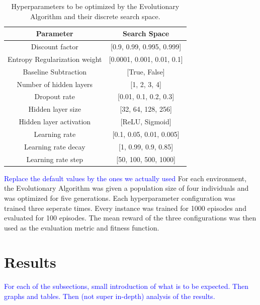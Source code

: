 \documentclass{article}
\newcommand{\TODO}[1]{\textcolor{blue}{#1}}
\begin{document}
\begin{table}[htbp]
    \centering
    \begin{tabular}
        {|c|c|}
        \toprule
        \textbf{Parameter} & \textbf{Search Space} \\
        \midrule
        Discount factor & [0.9, 0.99, 0.995, 0.999] \\
        Entropy Regularization weight & [0.0001, 0.001, 0.01, 0.1] \\
        Baseline Subtraction & [True, False] \\
        \midrule
        Number of hidden layers & [1, 2, 3, 4] \\
        Dropout rate & [0.01, 0.1, 0.2, 0.3] \\
        Hidden layer size & [32, 64, 128, 256] \\
        Hidden layer activation & [ReLU, Sigmoid] \\
        \midrule
        Learning rate & [0.1, 0.05, 0.01, 0.005] \\
        Learning rate decay & [1, 0.99, 0.9, 0.85] \\
        Learning rate step & [50, 100, 500, 1000] \\
        \bottomrule
    \end{tabular}
    \caption{Hyperparameters to be optimized by the Evolutionary Algorithm and their discrete search space. }
    \label{tab:optimized_parameters}
\end{table}

\TODO{Replace the default values by the ones we actually used}
For each environment, the Evolutionary Algorithm was given a population size of four individuals and was optimized for five generations. 
Each hyperparameter configuration was trained three seperate times. Every instance was trained for 1000 episodes and evaluated for 100 episodes.
The mean reward of the three configurations was then used as the evaluation metric and fitness function.   

\section{Results}
\label{sec:res}

\TODO{
    For each of the subsections, small introduction of what is to be expected.
    Then graphs and tables.
    Then (not super in-depth) analysis of the results.
}
\end{document}
